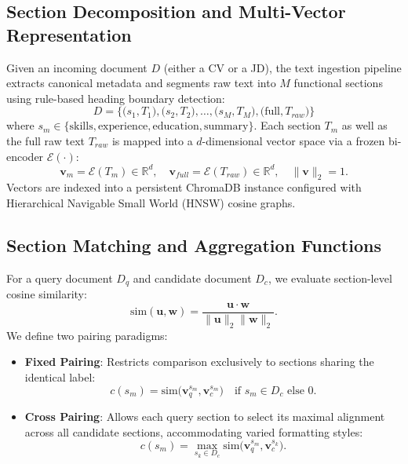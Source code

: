 \documentclass[runningheads]{llncs}
\begin{document}
\subsection{Section Decomposition and Multi-Vector Representation}
Given an incoming document $D$ (either a CV or a JD), the text ingestion pipeline extracts canonical metadata and segments raw text into $M$ functional sections using rule-based heading boundary detection:
\begin{equation}
    D = \Big\{ \big(s_1, T_1\big), \big(s_2, T_2\big), \dots, \big(s_M, T_M\big), \big(\text{full}, T_{raw}\big) \Big\}
\end{equation}
where $s_m \in \{\text{skills}, \text{experience}, \text{education}, \text{summary}\}$. Each section $T_m$ as well as the full raw text $T_{raw}$ is mapped into a $d$-dimensional vector space via a frozen bi-encoder $\mathcal{E}(\cdot)$:
\begin{equation}
    \mathbf{v}_m = \mathcal{E}(T_m) \in \mathbb{R}^d, \quad \mathbf{v}_{full} = \mathcal{E}(T_{raw}) \in \mathbb{R}^d, \quad \|\mathbf{v}\|_2 = 1.
\end{equation}
Vectors are indexed into a persistent ChromaDB instance configured with Hierarchical Navigable Small World (HNSW) cosine graphs.

\subsection{Section Matching and Aggregation Functions}
For a query document $D_q$ and candidate document $D_c$, we evaluate section-level cosine similarity:
\begin{equation}
    \text{sim}(\mathbf{u}, \mathbf{w}) = \frac{\mathbf{u} \cdot \mathbf{w}}{\|\mathbf{u}\|_2 \|\mathbf{w}\|_2}.
\end{equation}
We define two pairing paradigms:
\begin{itemize}
    \item \textbf{Fixed Pairing}: Restricts comparison exclusively to sections sharing the identical label:
    \begin{equation}
        c(s_m) = \text{sim}\big(\mathbf{v}_q^{s_m}, \mathbf{v}_c^{s_m}\big) \quad \text{if } s_m \in D_c \text{ else } 0.
    \end{equation}
    \item \textbf{Cross Pairing}: Allows each query section to select its maximal alignment across all candidate sections, accommodating varied formatting styles:
    \begin{equation}
        c(s_m) = \max_{s_k \in D_c} \text{sim}\big(\mathbf{v}_q^{s_m}, \mathbf{v}_c^{s_k}\big).
    \end{equation}
\end{itemize}
\end{document}
